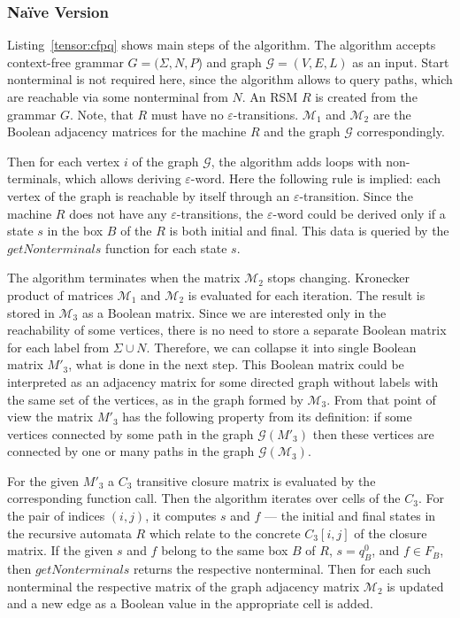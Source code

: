 \subsubsection{Na{\"i}ve Version}
Listing~\ref{tensor:cfpq} shows main steps of the algorithm.
The algorithm accepts context-free grammar $G=(\Sigma,N,P$) and graph $\mathcal{G}=(V,E,L)$ as an input.
Start nonterminal is not required here, since the algorithm allows to query paths, which are
reachable via some nonterminal from $N$.
An RSM $R$ is created from the grammar $G$.
Note, that $R$ must have no $\varepsilon$-transitions.
$\mathcal{M}_1$ and $\mathcal{M}_2$ are the Boolean adjacency matrices for the machine 
$R$ and the graph $\mathcal{G}$ correspondingly.

Then for each vertex $i$ of the graph $\mathcal{G}$, the algorithm adds loops 
with non-terminals, which allows deriving $\varepsilon$-word.
Here the following rule is implied: each vertex of the graph is reachable 
by itself through an $\varepsilon$-transition. Since the machine $R$ does 
not have any $\varepsilon$-transitions, the $\varepsilon$-word could be 
derived only if a state $s$ in the box $B$ of the $R$ is both initial and final.
This data is queried by the $getNonterminals$ function for each state $s$.

The algorithm terminates when the matrix $\mathcal{M}_2$ stops changing.
Kronecker product of matrices $\mathcal{M}_1$ and $\mathcal{M}_2$ is evaluated
for each iteration.
The result is stored in $\mathcal{M}_3$ as a Boolean matrix. Since we are interested
only in the reachability of some vertices, there is no need to store a separate
Boolean matrix for each label from $\Sigma \cup N$. Therefore, we can 
collapse it into single Boolean matrix $M'_3$, what is done in the next step.
This Boolean matrix could be interpreted as an adjacency matrix for some directed graph
without labels with the same set of the vertices, as in the graph formed by $\mathcal{M}_3$.
From that point of view the matrix $M'_3$ has the following property 
from its definition: if some vertices connected by some path in the graph $\mathcal{G}(M'_3)$ 
then these vertices are connected by one or many paths in the graph $\mathcal{G}(\mathcal{M}_3)$.

For the given $M'_3$ a $C_3$ transitive closure matrix
is evaluated by the corresponding function call. 
Then the algorithm iterates over cells of the $C_3$.
For the pair of indices $(i,j)$, it computes $s$ and $f$ --- 
the initial and final states in the recursive automata $R$ which relate 
to the concrete $C_3[i,j]$ of the closure matrix.
If the given $s$ and $f$ belong to the same box $B$ of $R$, $s = q_B^0$, 
and $f \in F_B$, then $getNonterminals$ returns the respective nonterminal.
Then for each such nonterminal the respective matrix of the graph adjacency 
matrix $\mathcal{M}_2$ is updated and a new edge as a Boolean value in the 
appropriate cell is added.

